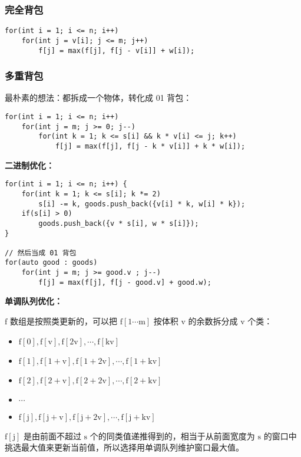 \documentclass[UTF8]{article}
\begin{document}
\subsubsection{完全背包}
\begin{lstlisting}[caption=完全背包]
for(int i = 1; i <= n; i++)
	for(int j = v[i]; j <= m; j++)
		f[j] = max(f[j], f[j - v[i]] + w[i]);
\end{lstlisting}


\subsubsection{多重背包}
最朴素的想法：都拆成一个物体，转化成 01 背包：
\begin{lstlisting}[caption=多重背包朴素写法]
for(int i = 1; i <= n; i++)
	for(int j = m; j >= 0; j--)
		for(int k = 1; k <= s[i] && k * v[i] <= j; k++)
			f[j] = max(f[j], f[j - k * v[i]] + k * w[i]);
\end{lstlisting}

\noindent \textbf{二进制优化：}
\begin{lstlisting}[caption=多重背包二进制优化]
for(int i = 1; i <= n; i++) {
	for(int k = 1; k <= s[i]; k *= 2)
		s[i] -= k, goods.push_back({v[i] * k, w[i] * k});
	if(s[i] > 0)
		goods.push_back({v * s[i], w * s[i]});
}

// 然后当成 01 背包
for(auto good : goods) 
	for(int j = m; j >= good.v ; j--)
		f[j] = max(f[j], f[j - good.v] + good.w);
\end{lstlisting}

\noindent \textbf{单调队列优化：}

$\mathrm{f}$ 数组是按照类更新的，可以把 $\mathrm{f[1 \cdots m]}$ 按体积 $\mathrm{v}$ 的余数拆分成 $\mathrm{v}$ 个类：

\begin{itemize}
	\item $\mathrm{f[0], f[v], f[2v], \cdots, f[kv]}$
	\item $\mathrm{f[1], f[1 + v], f[1 + 2v], \cdots, f[1 + kv]}$
	\item $\mathrm{f[2], f[2 + v], f[2 + 2v], \cdots, f[2 + kv]}$
	\item $\mathrm{\cdots}$
	\item $\mathrm{f[j], f[j + v], f[j + 2v], \cdots, f[j + kv]}$
\end{itemize}

$\mathrm{f[j]}$ 是由前面不超过 $\mathrm{s}$ 个的同类值递推得到的，相当于从前面宽度为 $\mathrm{s}$ 的窗口中挑选最大值来更新当前值，所以选择用单调队列维护窗口最大值。
\end{document}
